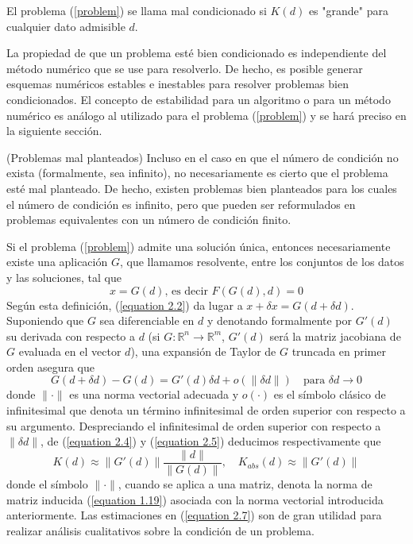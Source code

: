 El problema (\ref{problem}) se llama mal condicionado si  $K(d)$ es "grande" para cualquier dato admisible $d$.

La propiedad de que un problema esté bien condicionado es independiente del método numérico que se use para resolverlo. De hecho, es posible generar esquemas numéricos estables e inestables para resolver problemas bien condicionados. El concepto de estabilidad para un algoritmo o para un método numérico es análogo al utilizado para el problema (\ref{problem}) y se hará preciso en la siguiente sección.

\begin{remark}
    (Problemas mal planteados) Incluso en el caso en que el número de condición no exista (formalmente, sea infinito), no necesariamente es cierto que el problema esté mal planteado. De hecho, existen problemas bien planteados para los cuales el número de condición es infinito, pero que pueden ser reformulados en problemas equivalentes con un número de condición finito.
\end{remark}

Si el problema (\ref{problem}) admite una solución única, entonces necesariamente existe una aplicación $G$, que llamamos resolvente, entre los conjuntos de los datos y las soluciones, tal que
\begin{equation}
    x = G(d) \text{, es decir } F(G(d), d) = 0
    \label{equation 2.6}
\end{equation}
Según esta definición, (\ref{equation 2.2}) da lugar a $x + \delta x = G(d + \delta d)$. Suponiendo que $G$ sea diferenciable en $d$ y denotando formalmente por $G'(d)$ su derivada con respecto a $d$ (si $G: \mathbb{R}^n \rightarrow \mathbb{R}^m$, $G'(d)$ será la matriz jacobiana de $G$ evaluada en el vector $d$), una expansión de Taylor de $G$ truncada en primer orden asegura que 
\[G(d + \delta d) - G(d) = G'(d) \delta d + o(\| \delta d \|) \quad \text{para } \delta d \rightarrow 0 \]
donde $\| \cdot \|$ es una norma vectorial adecuada y $o(\cdot)$ es el símbolo clásico de infinitesimal que denota un término infinitesimal de orden superior con respecto a su argumento. Despreciando el infinitesimal de orden superior con respecto a $\| \delta d \|$, de (\ref{equation 2.4}) y (\ref{equation 2.5}) deducimos respectivamente que
\begin{equation}
    K(d) \approx \| G'(d) \| \frac{\| d \|}{\| G(d) \|}, \quad K_{abs}(d) \approx \| G'(d) \|
    \label{equation 2.7}
\end{equation}
donde el símbolo $\| \cdot \|$, cuando se aplica a una matriz, denota la norma de matriz inducida (\ref{equation 1.19}) asociada con la norma vectorial introducida anteriormente. Las estimaciones en (\ref{equation 2.7}) son de gran utilidad para realizar análisis cualitativos sobre la condición de un problema.

